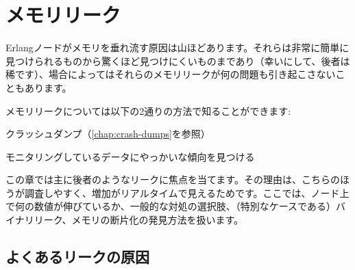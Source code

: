 \chapter{メモリリーク}
\label{chap:memory-leaks}

Erlangノードがメモリを垂れ流す原因は山ほどあります。それらは非常に簡単に見つけられるものから驚くほど見つけにくいものまであり（幸いにして、後者は稀です）、場合によってはそれらのメモリリークが何の問題も引き起こさないこともあります。

メモリリークについては以下の2通りの方法で知ることができます:

\begin{enumerate*}
	\item クラッシュダンプ（\ref{chap:crash-dumps}を参照）
	\item モニタリングしているデータにやっかいな傾向を見つける
\end{enumerate*}

この章では主に後者のようなリークに焦点を当てます。その理由は、こちらのほうが調査しやすく、増加がリアルタイムで見えるためです。ここでは、ノード上で何の数値が伸びているか、一般的な対処の選択肢、（特別なケースである）バイナリリーク、メモリの断片化の発見方法を扱います。

\section{よくあるリークの原因}

